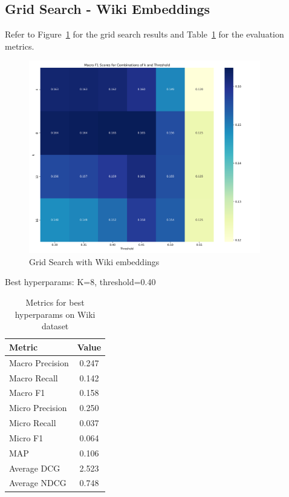 \documentclass[a4paper,11pt]{article}
\begin{document}
\subsection{Grid Search - Wiki Embeddings}
Refer to Figure~\ref{fig:wiki_embeddings_heatmap} for the grid search results and Table~\ref{tab:wiki_embeddings} for the evaluation metrics.
\begin{figure}
    \centering
    \includegraphics[width=0.9\textwidth]{wiki_embeddings_heatmap.png_1747347453.png}
    \caption{Grid Search with Wiki embeddings}
    \label{fig:wiki_embeddings_heatmap}
\end{figure}

Best hyperparams: K=8, threshold=0.40
\begin{table}
    \centering
    \begin{tabular}{|l|c|}
        \hline
        Metric          & Value \\
        \hline
        Macro Precision & 0.247 \\
        Macro Recall    & 0.142 \\
        Macro F1        & 0.158 \\
        Micro Precision & 0.250 \\
        Micro Recall    & 0.037 \\
        Micro F1        & 0.064 \\
        MAP             & 0.106 \\
        Average DCG     & 2.523 \\
        Average NDCG    & 0.748 \\
        \hline
    \end{tabular}
    \caption{Metrics for best hyperparams on Wiki dataset}
    \label{tab:wiki_embeddings}
\end{table}
\end{document}
